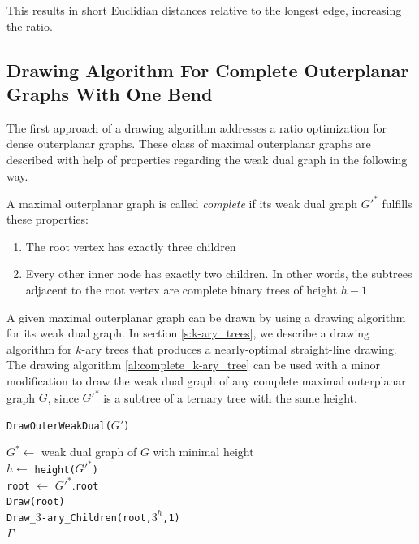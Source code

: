 This results in short Euclidian distances relative to the longest edge, increasing the ratio.\\

\subsection{Drawing Algorithm For Complete Outerplanar Graphs With One Bend}
The first approach of a drawing algorithm addresses a ratio optimization for dense outerplanar graphs. These class of maximal outerplanar graphs are described with help of properties regarding the weak dual graph in the following way.
\begin{definition}\label{def:complete_maximal_outerplanar}
	A maximal outerplanar graph is called \emph{complete} if its weak dual graph $G'^*$ fulfills these properties:
	\begin{enumerate}
		\item The root vertex has exactly three children
		\item Every other inner node has exactly two children. In other words, the subtrees adjacent to the root vertex are complete binary trees of height $h-1$
	\end{enumerate}
\end{definition}
A given maximal outerplanar graph can be drawn by using a drawing algorithm for its weak dual graph. In section \ref{s:k-ary_trees}, we describe a drawing algorithm for $k$-ary trees that produces a nearly-optimal straight-line drawing. The drawing algorithm \ref{al:complete_k-ary_tree} can be used with a minor modification to draw the weak dual graph of any complete maximal outerplanar graph $G$, since $G'^*$ is a subtree of a ternary tree with the same height.\\

\begin{algorithm}[H]
	\caption{\texttt{DrawOuterWeakDual($G'$)}}\label{al:drawouterweakdual}
	$G^* \gets$ weak dual graph of $G$ with minimal height\\
	$h \gets$ \texttt{height($G'^*$)}\\
	\texttt{root} $\gets$ $G'^*$.\texttt{root}\\
	\texttt{Draw(root)}\\
	\texttt{Draw\_$3$-ary\_Children(\texttt{root},$3^h$,1)}\\
	\Return $\Gamma$
\end{algorithm}

